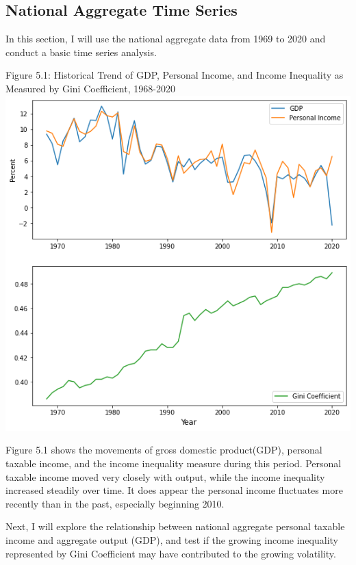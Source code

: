 \documentclass{article}
\begin{document}
\subsection{National Aggregate Time Series}
In this section, I will use the national aggregate data from 1969 to 2020 and conduct a basic time series analysis. 
\begin{center}
Figure 5.1: Historical Trend of GDP, Personal Income, and Income Inequality as Measured by Gini Coefficient, 1968-2020
\includegraphics[scale=0.5]{images/historical_time_series.png}
\end{center}

Figure 5.1 shows the movements of gross domestic product(GDP), personal taxable income, and the income inequality measure during this period. Personal taxable income moved very closely with output, while the income inequality increased steadily over time. It does appear the personal income fluctuates more recently than in the past, especially beginning 2010. 

\vspace{5mm}

Next, I will explore the relationship between national aggregate personal taxable income and aggregate output (GDP), and test if the growing income inequality represented by Gini Coefficient may have contributed to the growing volatility. 
\end{document}
